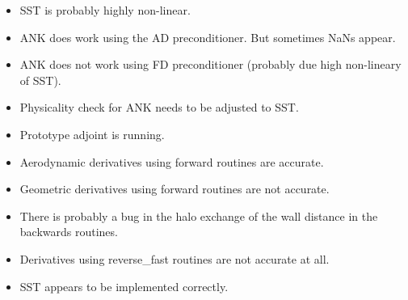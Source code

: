 \begin{itemize}
    \item SST is probably highly non-linear.

    \item ANK does work using the AD preconditioner. But sometimes NaNs appear.

    \item ANK does not work using FD preconditioner (probably due high
        non-lineary of SST).

    \item Physicality check for ANK needs to be adjusted to SST.

    \item Prototype adjoint is running.

    \item Aerodynamic derivatives using forward routines are accurate.

    \item Geometric derivatives using forward routines are not accurate.

    \item There is probably a bug in the halo exchange of the wall distance in
        the backwards routines.

    \item Derivatives using reverse\_fast routines are not accurate at all.

    \item SST appears to be implemented correctly.
\end{itemize}
